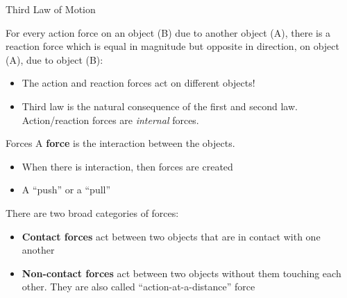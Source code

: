 \documentclass[12pt,compress,aspectratio=169]{beamer}
\begin{document}
\begin{frame}{Third Law of Motion}
  \begin{center}
  \end{center}
  For every action force on an object (B) due to another object (A), there is a
  reaction force which is equal in magnitude but opposite in direction, on
  object (A), due to object (B):

  \begin{itemize}
  \item The action and reaction forces act on different objects!
  \item Third law is the natural consequence of the first and second law.
    Action/reaction forces are \emph{internal} forces.
  \end{itemize}
  \vspace{.2in}
\end{frame}



\begin{frame}{Forces}
  A \textbf{force} is the interaction between the objects.
  \begin{itemize}
  \item When there is interaction, then forces are created
  \item A ``push'' or a ``pull''
  \end{itemize}
  There are two broad categories of forces:
  \begin{itemize}
  \item\textbf{Contact forces} act between two objects that are in contact
    with one another
  \item\textbf{Non-contact forces} act between two objects without them
    touching each other. They are also called ``action-at-a-distance'' force
  \end{itemize}
\end{frame}
\end{document}
